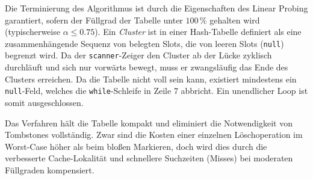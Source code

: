 Die Terminierung des Algorithmus ist durch die Eigenschaften des Linear Probing garantiert, sofern der Füllgrad der Tabelle unter $100\,\%$ gehalten wird (typischerweise $\alpha \le 0.75$).
Ein \emph{Cluster} ist in einer Hash-Tabelle definiert als eine zusammenhängende Sequenz von belegten Slots, die von leeren Slots (\texttt{null}) begrenzt wird. Da der \texttt{scanner}-Zeiger den Cluster ab der Lücke zyklisch durchläuft und sich nur vorwärts bewegt, muss er zwangsläufig das Ende des Clusters erreichen. Da die Tabelle nicht voll sein kann, existiert mindestens ein \texttt{null}-Feld, welches die \texttt{while}-Schleife in Zeile 7 abbricht. Ein unendlicher Loop ist somit ausgeschlossen.

Das Verfahren hält die Tabelle kompakt und eliminiert die Notwendigkeit von Tombstones vollständig. Zwar sind die Kosten einer einzelnen Löschoperation im Worst-Case höher als beim bloßen Markieren, doch wird dies durch die verbesserte Cache-Lokalität und schnellere Suchzeiten (Misses) bei moderaten Füllgraden kompensiert.


